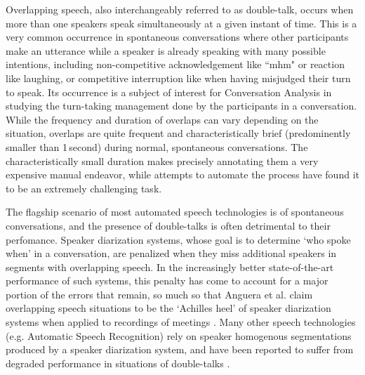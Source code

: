 \documentclass[a4paper]{article}
\begin{document}
Overlapping speech, also interchangeably referred to as double-talk,
occurs when more than one speakers speak simultaneously at a given instant of time.
This is a very common occurrence in spontaneous conversations where other participants make an utterance while a speaker is already speaking with many possible intentions,
including non-competitive acknowledgement like “mhm" or reaction like laughing,
or competitive interruption like when having misjudged their turn to speak.
Its occurrence
is a subject of interest for Conversation Analysis in studying the turn-taking management done by the participants in a conversation.
While the frequency and duration of overlaps can vary depending on the situation,
overlaps are quite frequent and characteristically brief (predominently smaller than 1\,second)
during normal, spontaneous conversations.  %
The characteristically small duration makes precisely annotating them a very expensive manual endeavor,
while attempts to automate the process have found it to be an extremely challenging task.

The flagship scenario of most automated speech technologies is of spontaneous conversations,
and the presence of double-talks is often detrimental to their perfomance.
Speaker diarization systems, whose goal is to determine `who spoke when' in a conversation,
are penalized when they miss additional speakers in segments with overlapping speech.
In the increasingly better state-of-the-art performance of such systems,
this penalty has come to account for a major portion of the errors that remain,
so much so that Anguera et al. claim overlapping speech situations to be the `Achilles heel' of speaker diarization systems when applied to recordings of meetings \cite{anguera_speaker_2012}.
Many other speech technologies (e.g. Automatic Speech Recognition) rely on speaker homogenous segmentations produced by a speaker diarization system,
and have been reported to suffer from degraded performance in situations of double-talks \cite{cetin_speaker_2006}.
\end{document}
